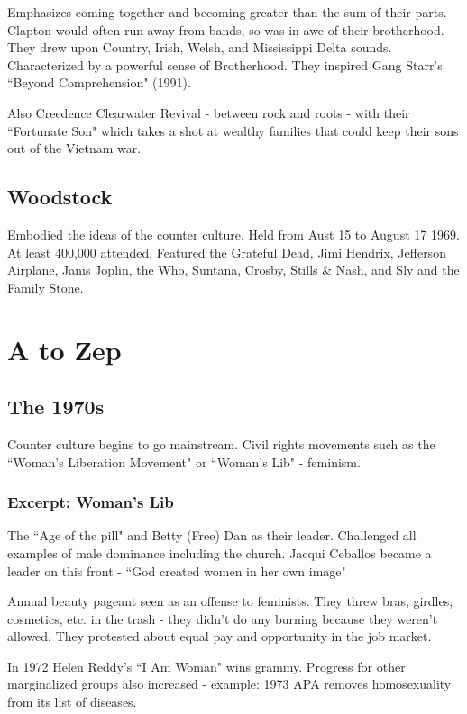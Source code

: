 \documentclass[12pt, a4paper, twoside, openright, titlepage]{book}
\begin{document}
Emphasizes coming together and becoming greater than the sum of their parts. Clapton would often run away from bands, so was in awe of their brotherhood. They drew upon Country, Irish, Welsh, and Mississippi Delta sounds. Characterized by a powerful sense of Brotherhood. They inspired Gang Starr's ``Beyond Comprehension" (1991).


Also Creedence Clearwater Revival - between rock and roots - with their ``Fortunate Son" which takes a shot at wealthy families that could keep their sons out of the Vietnam war.


\section{Woodstock}

Embodied the ideas of the counter culture. Held from Aust 15 to August 17 1969. At least 400,000 attended. Featured the Grateful Dead, Jimi Hendrix, Jefferson Airplane, Janis Joplin, the Who, Suntana, Crosby, Stills \& Nash, and Sly and the Family Stone.






\chapter{A to Zep}

\section{The 1970s}

Counter culture begins to go mainstream. Civil rights movements such as the ``Woman's Liberation Movement" or ``Woman's Lib" - feminism.

\subsection{Excerpt: Woman's Lib}

The ``Age of the pill" and Betty (Free) Dan as their leader. Challenged all examples of male dominance including the church. Jacqui Ceballos became a leader on this front - ``God created women in her own image"

Annual beauty pageant seen as an offense to feminists. They threw bras, girdles, cosmetics, etc. in the trash - they didn't do any burning because they weren't allowed. They protested about equal pay and opportunity in the job market. 


In 1972 Helen Reddy's ``I Am Woman" wins grammy. Progress for other marginalized groups also increased - example: 1973 APA removes homosexuality from its list of diseases.
\end{document}
